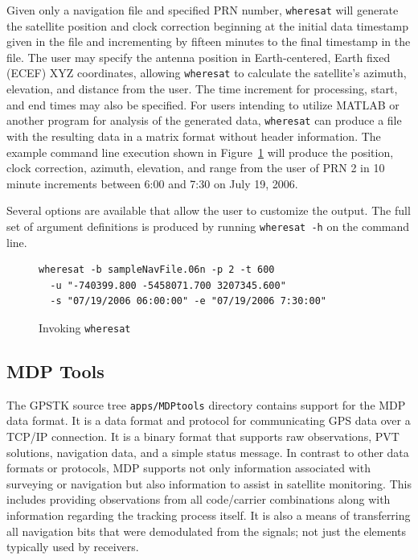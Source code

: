 \documentclass{ion-gps}
\newcommand{\gpstkapplication}[1]{\texttt{#1}}
\newcommand{\gpstkdir}[1]{\texttt{#1}}
\begin{document}
Given only a navigation file and specified PRN number,
\gpstkapplication{wheresat} will generate the satellite position and
clock correction beginning at the initial data timestamp given in the
file and incrementing by fifteen minutes to the final timestamp in
the file. The user may specify the antenna position in Earth-centered,
Earth fixed (ECEF) XYZ coordinates, allowing
\gpstkapplication{wheresat} to calculate the satellite's azimuth,
elevation, and distance from the user.  The time increment for
processing, start, and end times may also be specified.  For users
intending to utilize MATLAB\cite{matlabsite} or another program for analysis of the
generated data, \gpstkapplication{wheresat} can produce a file with
the resulting data in a matrix format without header information.  The
example command line execution shown in Figure~\ref{fig:wheresat} will
produce the position, clock correction, azimuth, elevation, and range
from the user of PRN 2 in 10 minute increments between 6:00 and 7:30
on July 19, 2006.

Several options are available that allow the user to customize the 
output. The full set of argument definitions is produced by 
running \gpstkapplication{wheresat -h} on the command line.


\begin{figure}[htbp]
   \begin{scriptsize}
   \begin{bf}
   \begin{lstlisting}
wheresat -b sampleNavFile.06n -p 2 -t 600
  -u "-740399.800 -5458071.700 3207345.600" 
  -s "07/19/2006 06:00:00" -e "07/19/2006 7:30:00"
   \end{lstlisting}
   \end{bf}
   \end{scriptsize}
  \caption{Invoking \gpstkapplication{wheresat}}
  \label{fig:wheresat}
\end{figure}


\subsection*{MDP Tools}

The GPSTK source tree \gpstkdir{apps/MDPtools} directory contains
support for the MDP data format. It is a
data format and protocol for communicating GPS data over a TCP/IP
connection. It is a binary format that supports raw observations, PVT
solutions, navigation data, and a simple status message. In contrast
to other data formats or protocols, MDP supports not only information
associated with surveying or navigation but also information to
assist in satellite monitoring. This includes providing observations
from all code/carrier combinations along with information regarding
the tracking process itself. It is also a means of transferring all
navigation bits that were demodulated from the signals; not just the
elements typically used by receivers.
\end{document}
